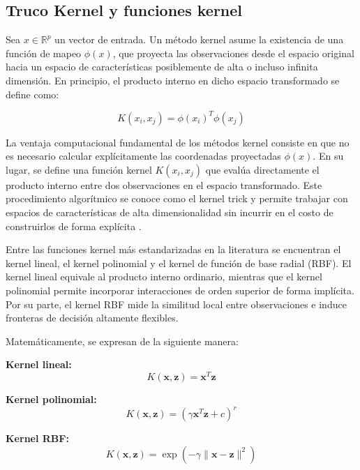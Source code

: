 \subsection{Truco Kernel y funciones kernel}

Sea $x \in \mathbb{R}^p$ un vector de entrada. Un método kernel asume la existencia de una función de mapeo $\phi(x)$, que proyecta las observaciones desde el espacio original hacia un espacio de características posiblemente de alta o incluso infinita dimensión. En principio, el producto interno en dicho espacio transformado se define como:

\begin{equation}
	K(x_i,x_j) = \phi(x_i)^T\phi(x_j)
	\label{eq:EMT15}
\end{equation}


La ventaja computacional fundamental de los métodos kernel consiste en que no es necesario calcular explícitamente las coordenadas proyectadas $\phi(x)$. En su lugar, se define una función kernel $K(x_i,x_j)$ que evalúa directamente el producto interno entre dos observaciones en el espacio transformado. Este procedimiento algorítmico se conoce como el kernel trick y permite trabajar con espacios de características de alta dimensionalidad sin incurrir en el costo de construirlos de forma explícita \cite{bishop2006pattern}.

Entre las funciones kernel más estandarizadas en la literatura se encuentran el kernel lineal, el kernel polinomial y el kernel de función de base radial (RBF). El kernel lineal equivale al producto interno ordinario, mientras que el kernel polinomial permite incorporar interacciones de orden superior de forma implícita. Por su parte, el kernel RBF mide la similitud local entre observaciones e induce fronteras de decisión altamente flexibles.

Matemáticamente, se expresan de la siguiente manera:

\noindent\textbf{Kernel lineal:}
\begin{equation}
	K(\mathbf{x}, \mathbf{z}) = \mathbf{x}^T \mathbf{z}
	\label{eq:EMT16}
\end{equation}

\noindent\textbf{Kernel polinomial:}
\begin{equation}
	K(\mathbf{x}, \mathbf{z}) = (\gamma \mathbf{x}^T \mathbf{z} + c)^r
	\label{eq:EMT17}
\end{equation}

\noindent\textbf{Kernel RBF:}
\begin{equation}
	K(\mathbf{x}, \mathbf{z}) = \exp(-\gamma \|\mathbf{x} - \mathbf{z}\|^2)
	\label{eq:EMT18}
\end{equation}


